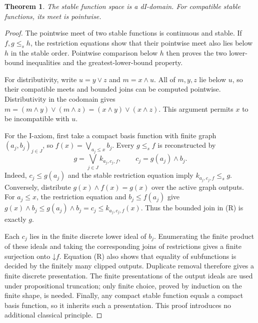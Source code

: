 \documentclass[11pt]{article}
\newtheorem{theorem}{Theorem}[section]
\begin{document}
\begin{theorem}
The stable function space is a dI-domain. For compatible stable functions,
its meet is pointwise.
\end{theorem}
\begin{proof}
The pointwise meet of two stable functions is continuous and stable.
If $f,g\le_s h$, the restriction equations show that their pointwise
meet also lies below $h$ in the stable order. Pointwise comparison below
$h$ then proves the two lower-bound inequalities and the greatest-lower-bound
property.

For distributivity, write $u=y\vee z$ and $m=x\wedge u$. All of $m,y,z$
lie below $u$, so their compatible meets and bounded joins can be
computed pointwise. Distributivity in the codomain gives
$m=(m\wedge y)\vee(m\wedge z)=(x\wedge y)\vee(x\wedge z)$.
This argument permits $x$ to be incompatible with $u$.

For the I-axiom, first take a compact basis function with finite graph
$(a_j,b_j)_{j\in J}$, so
$f(x)=\bigvee_{a_j\le x}b_j$. Every $g\le_s f$ is reconstructed by
\[
 g=\bigvee_{j\in J} k_{a_j,c_j,f},\qquad
 c_j=g(a_j)\wedge b_j.
 \tag{R}
\]
Indeed, $c_j\le g(a_j)$ and the stable restriction equation imply
$k_{a_j,c_j,f}\le_s g$. Conversely, distribute $g(x)\wedge f(x)=g(x)$
over the active graph outputs. For $a_j\le x$, the restriction equation
and $b_j\le f(a_j)$ give
$g(x)\wedge b_j\le g(a_j)\wedge b_j=c_j\le k_{a_j,c_j,f}(x)$.
Thus the bounded join in (R) is exactly $g$.

Each $c_j$ lies in the finite discrete lower ideal of $b_j$. Enumerating
the finite product of these ideals and taking the corresponding joins
of restrictions gives a finite surjection onto $\mathord\downarrow f$.
Equation (R) also shows that equality of subfunctions is decided by the
finitely many clipped outputs. Duplicate removal therefore gives a
finite discrete presentation. The finite presentations of the output
ideals are used under propositional truncation; only finite choice,
proved by induction on the finite shape, is needed. Finally, any compact
stable function equals a compact basis function, so it inherits such a
presentation. This proof introduces no additional classical principle.
\end{proof}
\end{document}
